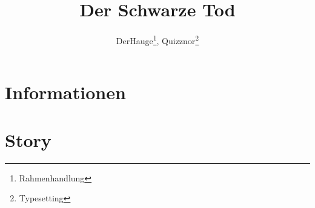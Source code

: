 \documentclass{include/protokollclass}
\title{Der Schwarze Tod}
\author{DerHauge\thanks{Rahmenhandlung}, Quizznor\thanks{Typesetting}}
\begin{document}
\maketitle
\tableofcontents

\chapter{Informationen}


\chapter{Story}

\end{document}
